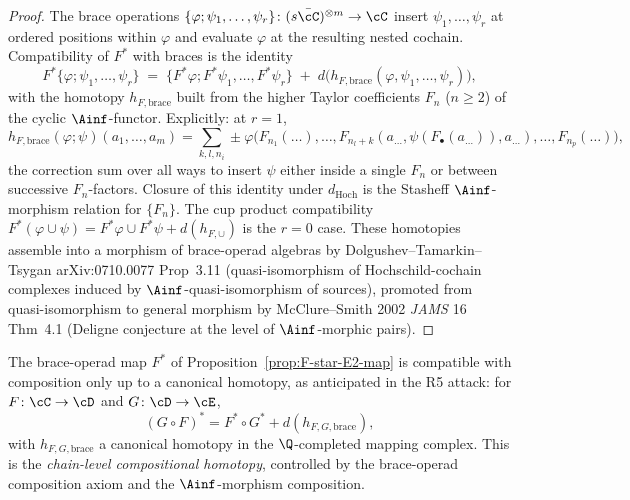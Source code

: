 \begin{proof}
The brace operations
$\{\varphi; \psi_1, \ldots, \psi_r\}
 \colon (s\bar\cC)^{\otimes m} \to \cC$
insert $\psi_1, \ldots, \psi_r$ at ordered positions within $\varphi$
and evaluate $\varphi$ at the resulting nested cochain.  Compatibility
of $F^*$ with braces is the identity
\[
  F^* \{\varphi; \psi_1, \ldots, \psi_r\}
  \;=\;
  \{F^* \varphi; F^* \psi_1, \ldots, F^* \psi_r\}
  \;+\; d\bigl(h_{F, \mathrm{brace}}(\varphi, \psi_1, \ldots, \psi_r)\bigr),
\]
with the homotopy $h_{F,\mathrm{brace}}$ built from the higher Taylor
coefficients $F_n$ ($n \geq 2$) of the cyclic $\Ainf$-functor.
Explicitly: at $r = 1$,
\[
  h_{F,\mathrm{brace}}(\varphi; \psi)(a_1,\ldots,a_m)
  = \sum_{k,l,n_i}
    \pm \varphi\bigl(F_{n_1}(\ldots), \ldots,
         F_{n_l+k}(a_{\ldots}, \psi(F_\bullet(a_{\ldots})), a_{\ldots}),
         \ldots, F_{n_p}(\ldots)\bigr),
\]
the correction sum over all ways to insert $\psi$ either inside a
single $F_n$ or between successive $F_n$-factors.  Closure of this
identity under $d_{\mathrm{Hoch}}$ is the Stasheff $\Ainf$-morphism
relation for $\{F_n\}$.  The cup product compatibility
$F^*(\varphi \cup \psi) = F^* \varphi \cup F^* \psi + d(h_{F,\cup})$
is the $r = 0$ case.  These homotopies assemble into a morphism of
brace-operad algebras by Dolgushev--Tamarkin--Tsygan
arXiv:0710.0077 Prop~3.11 (quasi-isomorphism of Hochschild-cochain
complexes induced by $\Ainf$-quasi-isomorphism of sources), promoted
from quasi-isomorphism to general morphism by McClure--Smith 2002
\emph{JAMS} 16 Thm~4.1 (Deligne conjecture at the level of
$\Ainf$-morphic pairs).
\end{proof}

\begin{remark}
\label{rem:compositional-compat-F-star}
The brace-operad map $F^*$ of Proposition~\ref{prop:F-star-E2-map} is
compatible with composition only up to a canonical homotopy, as
anticipated in the R5 attack: for $F \colon \cC \to \cD$ and $G \colon
\cD \to \cE$,
\[
  (G\circ F)^* = F^* \circ G^* + d(h_{F,G,\mathrm{brace}}),
\]
with $h_{F,G,\mathrm{brace}}$ a canonical homotopy in the
$\Q$-completed mapping complex.  This is the \emph{chain-level
compositional homotopy}, controlled by the brace-operad composition
axiom and the $\Ainf$-morphism composition.
\end{remark}

